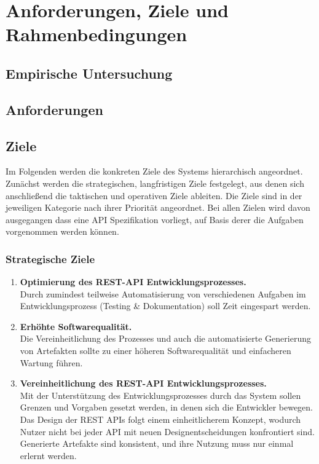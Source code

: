
\section{Anforderungen, Ziele und Rahmenbedingungen}

\subsection{Empirische Untersuchung}

\subsection{Anforderungen}

\subsection{Ziele}

Im Folgenden werden die konkreten Ziele des Systems hierarchisch angeordnet. Zunächst werden die strategischen, langfristigen Ziele festgelegt, aus denen sich anschließend die taktischen und operativen Ziele ableiten. Die Ziele sind in der jeweiligen Kategorie nach ihrer Priorität angeordnet. Bei allen Zielen wird davon ausgegangen dass eine API Spezifikation vorliegt, auf Basis derer die Aufgaben vorgenommen werden können.


\subsubsection{Strategische Ziele}

\begin{enumerate}
	\item \textbf{Optimierung des REST-API Entwicklungsprozesses.} \\
	Durch zumindest teilweise Automatisierung von verschiedenen Aufgaben im Entwicklungsprozess (Testing \& Dokumentation) soll Zeit eingespart werden.
	\item \textbf{Erhöhte Softwarequalität.} \\
	Die Vereinheitlichung des Prozesses und auch die automatisierte Generierung von Artefakten sollte zu einer höheren Softwarequalität und einfacheren Wartung führen.
	\item \textbf{Vereinheitlichung des REST-API Entwicklungsprozesses.} \\
	Mit der Unterstützung des Entwicklungsprozesses durch das System sollen Grenzen und Vorgaben gesetzt werden, in denen sich die Entwickler bewegen. Das Design der REST APIs folgt einem einheitlicherem Konzept, wodurch Nutzer nicht bei jeder API mit neuen Designentscheidungen konfrontiert sind. Generierte Artefakte sind konsistent, und ihre Nutzung muss nur einmal erlernt werden.	
\end{enumerate}

